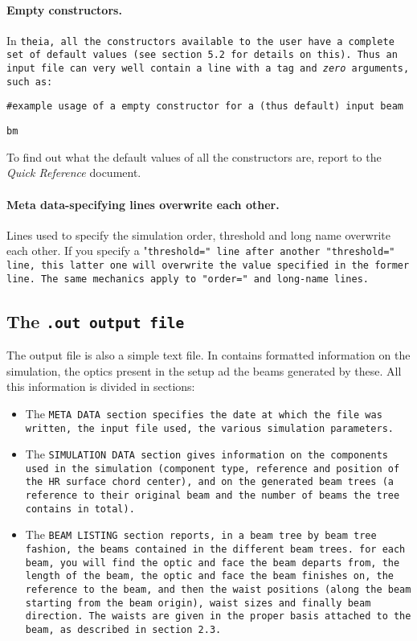 \documentclass{article}
\begin{document}
\paragraph{Empty constructors.}In \tt{theia}, all the constructors available to the user have a complete set of default values (see section 5.2 for details on this). Thus an input file can very well contain a line with a tag and \textit{zero} arguments, such as:

\tt{\#example usage of a empty constructor for a (thus default) input beam}

\tt{bm}


To find out what the default values of all the constructors are, report to the \textit{Quick Reference} document.


\paragraph{Meta data-specifying lines overwrite each other.} Lines used to specify the simulation order, threshold and long name overwrite each other. If you specify a "\tt{threshold=}" line after another "\tt{threshold=}" line, this latter one will overwrite the value specified in the former line. The same mechanics apply to "\tt{order=}" and long-name lines.

\subsection{The \tt{.out} output file}
The output file is also a simple text file. In contains formatted information on the simulation, the optics present in the setup ad the beams generated by these. All this information is divided in sections:

\begin{itemize}
\item The \tt{META DATA} section specifies the date at which the file was written, the input file used, the various simulation parameters.

\item The \tt{SIMULATION DATA} section gives information on the components used in the simulation (component type, reference and position of the HR surface chord center), and on the generated beam trees (a reference to their original beam and the number of beams the tree contains in total).

\item The \tt{BEAM LISTING} section reports, in a beam tree by beam tree fashion, the beams  contained in the different beam trees. for each beam, you will find the optic and face the beam departs from, the length of the beam, the optic and face the beam finishes on, the reference to the beam, and then the waist positions (along the beam starting from the beam origin), waist sizes and finally beam direction. The waists are given in the proper basis attached to the beam, as described in section 2.3.
\end{itemize}
\end{document}
